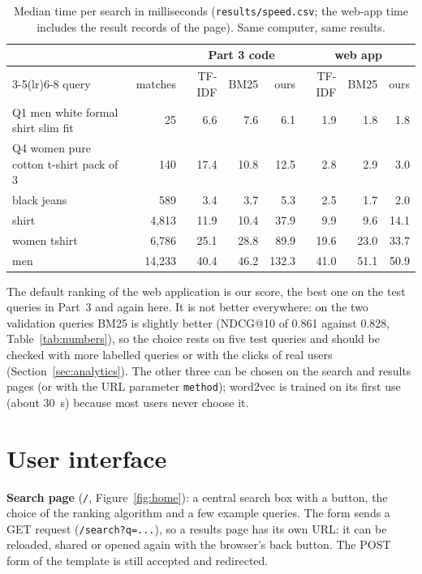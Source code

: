 \documentclass[11pt,a4paper]{article}
\newcommand{\code}[1]{\texttt{#1}}
\begin{document}
\begin{table}[H]
\centering\small
\caption{Median time per search in milliseconds (\code{results/speed.csv}; the web-app time includes the result
records of the page). Same computer, same results.}
\label{tab:speed}
\begin{tabular}{@{}lr rrr rrr@{}}
\toprule
 & & \multicolumn{3}{c}{Part 3 code} & \multicolumn{3}{c}{web app}\\
\cmidrule(lr){3-5}\cmidrule(lr){6-8}
query & matches & TF-IDF & BM25 & ours & TF-IDF & BM25 & ours\\
\midrule
Q1 men white formal shirt slim fit & 25 & 6.6 & 7.6 & 6.1 & 1.9 & 1.8 & 1.8\\
Q4 women pure cotton t-shirt pack of 3 & 140 & 17.4 & 10.8 & 12.5 & 2.8 & 2.9 & 3.0\\
black jeans & 589 & 3.4 & 3.7 & 5.3 & 2.5 & 1.7 & 2.0\\
shirt & 4,813 & 11.9 & 10.4 & 37.9 & 9.9 & 9.6 & 14.1\\
women tshirt & 6,786 & 25.1 & 28.8 & 89.9 & 19.6 & 23.0 & 33.7\\
men & 14,233 & 40.4 & 46.2 & 132.3 & 41.0 & 51.1 & 50.9\\
\bottomrule
\end{tabular}
\end{table}

The default ranking of the web application is our score, the best one on the test queries in Part~3 and again here.
It is not better everywhere: on the two validation queries BM25 is slightly better (NDCG@10 of 0.861 against 0.828,
Table~\ref{tab:numbers}), so the choice rests on five test queries and should be checked with more labelled queries
or with the clicks of real users (Section~\ref{sec:analytics}). The other three can
be chosen on the search and results pages (or with the URL parameter \code{method}); word2vec is trained on its first
use (about 30~s) because most users never choose it.

\section{User interface}
\label{sec:ui}

\textbf{Search page} (\code{/}, Figure~\ref{fig:home}): a central search box with a button, the choice of the ranking
algorithm and a few example queries. The form sends a GET request (\code{/search?q=...}), so a results page has its
own URL: it can be reloaded, shared or opened again with the browser's back button. The POST form of the template is
still accepted and redirected.
\end{document}
